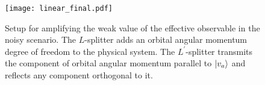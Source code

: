 \documentclass[aps,pra,showpacs,twoside,twocolumn,10pt]{revtex4-1}
\begin{document}


\begin{figure}
\texttt{[image: linear\_final.pdf]}
\caption{Setup for amplifying the weak value of the effective observable in the noisy scenario. The $L$-splitter adds an orbital angular momentum degree of freedom to the physical system. The $L^\prime$-splitter transmits the component of orbital angular momentum parallel to $\ket{v_a}$ and reflects any component orthogonal to it.}
\label{fig2}
\end{figure}
\end{document}
